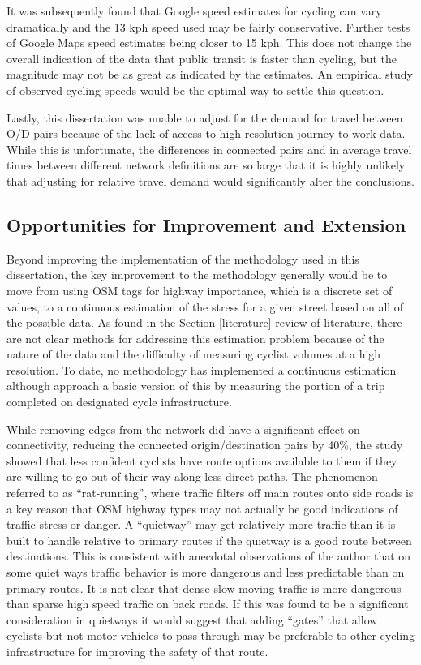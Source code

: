 It was subsequently found that Google speed estimates for cycling can vary dramatically and the 13 kph speed used may be fairly conservative. Further tests of Google Maps speed estimates being closer to 15 kph. This does not change the overall indication of the data that public transit is faster than cycling, but the magnitude may not be as great as indicated by the estimates. An empirical study of observed cycling speeds would be the optimal way to settle this question. 

Lastly, this dissertation was unable to adjust for the demand for travel between O/D pairs because of the lack of access to high resolution journey to work data. While this is unfortunate, the differences in connected pairs and in average travel times between different network definitions are so large that it is highly unlikely that adjusting for relative travel demand would significantly alter the conclusions. 

\subsection{Opportunities for Improvement and Extension}

Beyond improving the implementation of the methodology used in this dissertation, the key improvement to the methodology generally would be to move from using OSM tags for highway importance, which is a discrete set of values, to a continuous estimation of the stress for a given street based on all of the possible data. As found in the Section \ref{literature} review of literature, there are not clear methods for addressing this estimation problem because of the nature of the data and the difficulty of measuring cyclist volumes at a high resolution. To date, no methodology has implemented a continuous estimation although \textcite{boisjoly2019bicycle} approach a basic version of this by measuring the portion of a trip completed on designated cycle infrastructure. 

While removing edges from the network did have a significant effect on connectivity, reducing the connected origin/destination pairs by 40\%, the study showed that less confident cyclists have route options available to them if they are willing to go out of their way along less direct paths. The phenomenon referred to as ``rat-running'', where traffic filters off main routes onto side roads is a key reason that OSM highway types may not actually be good indications of traffic stress or danger. A ``quietway'' may get relatively more traffic than it is built to handle relative to primary routes if the quietway is a good route between destinations. This is consistent with anecdotal observations of the author that on some quiet ways traffic behavior is more dangerous and less predictable than on primary routes. It is not clear that dense slow moving traffic is more dangerous than sparse high speed traffic on back roads. If this was found to be a significant consideration in quietways it would suggest that adding ``gates'' that allow cyclists but not motor vehicles to pass through may be preferable to other cycling infrastructure for improving the safety of that route.

